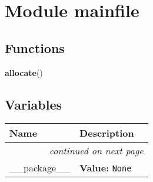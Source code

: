 %
%
%


\section{Module mainfile}

    \label{mainfile}


  \subsection{Functions}

    \label{mainfile:allocate}

    \vspace{0.5ex}

\hspace{.8\funcindent}\begin{boxedminipage}{\funcwidth}

    \raggedright \textbf{allocate}()

\setlength{\parskip}{2ex}
\setlength{\parskip}{1ex}
    \end{boxedminipage}



  \subsection{Variables}

    \vspace{-1cm}
\hspace{\varindent}\begin{longtable}{|p{\varnamewidth}|p{\vardescrwidth}|l}
\cline{1-2}
\cline{1-2} \centering \textbf{Name} & \centering \textbf{Description}& \\
\cline{1-2}
\endhead\cline{1-2}\multicolumn{3}{r}{\small\textit{continued on next page}}\\\endfoot\cline{1-2}
\endlastfoot\raggedright \_\-\_\-p\-a\-c\-k\-a\-g\-e\-\_\-\_\- & \raggedright \textbf{Value:} 
{\tt None}&\\
\cline{1-2}
\end{longtable}

